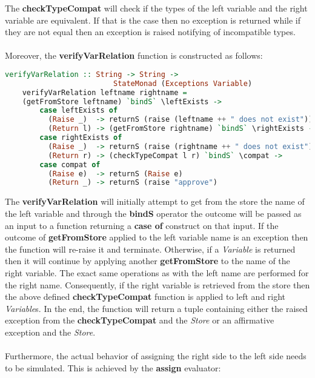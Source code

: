 \documentclass[a4paper, onecolumn]{article}
\begin{document}
    \noindent The \textbf{checkTypeCompat} will check if the types of the left variable and the right variable are equivalent. If that is the case then no exception is returned while if they are not equal then an exception is raised notifying of incompatible types. \\ \\
    Moreover, the \textbf{verifyVarRelation} function is constructed as follows: 
    
    \begin{tcolorbox}
    \begin{lstlisting}[language=Haskell] 
    verifyVarRelation :: String -> String ->
                         StateMonad (Exceptions Variable)
    verifyVarRelation leftname rightname = 
    (getFromStore leftname) `bindS` \leftExists -> 
        case leftExists of
          (Raise _)  -> returnS (raise (leftname ++ " does not exist"))                               
          (Return l) -> (getFromStore rightname) `bindS` \rightExists -> 
        case rightExists of                                                                           
          (Raise _)  -> returnS (raise (rightname ++ " does not exist")
          (Return r) -> (checkTypeCompat l r) `bindS` \compat -> 
        case compat of 
          (Raise e)  -> returnS (Raise e)
          (Return _) -> returnS (raise "approve")
    \end{lstlisting}
    \end{tcolorbox}
    
    \noindent The \textbf{verifyVarRelation} will initially attempt to get from the store the name of the left variable and through the \textbf{bindS} operator the outcome will be passed as an input to a function returning a \textbf{case of} construct on that input. If the outcome of \textbf{getFromStore} applied to the left variable name is an exception then the function will re-raise it and terminate. Otherwise, if a \textit{Variable} is returned then it will continue by applying another \textbf{getFromStore} to the name of the right variable. The exact same operations as with the left name are performed for the right name. Consequently, if the right variable is retrieved from the store then the above defined \textbf{checkTypeCompat} function is applied to left and right \textit{Variable}s. In the end, the function will return a tuple containing either the raised exception from the \textbf{checkTypeCompat} and the \textit{Store} or an affirmative exception and the \textit{Store}. \\ \\
    \noindent Furthermore, the actual behavior of assigning the right side to the left side needs to be simulated. This is achieved by the \textbf{assign} evaluator: 
    
\end{document}
